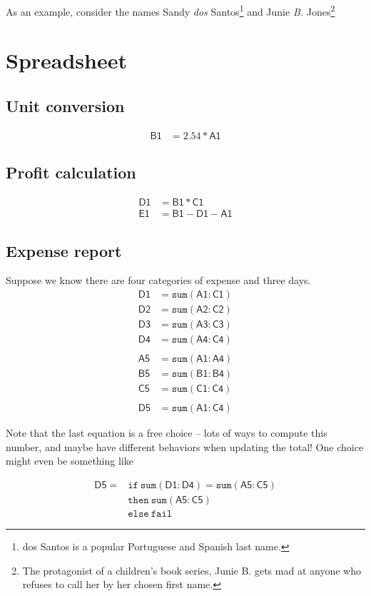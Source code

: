 \documentclass{article}
\newcommand\Sum{\texttt{sum}}
\newcommand\If{\texttt{if}}
\newcommand\Then{\texttt{then}}
\newcommand\Else{\texttt{else}}
\newcommand\Fail{\texttt{fail}}
\newcommand\cell[1]{\mathsf{#1}}
\begin{document}
As an example, consider the names Sandy \emph{dos} Santos\footnote{dos Santos
is a popular Portuguese and Spanish last name.}
and Junie \emph{B.} Jones\footnote{The protagonist of a children's
book series, Junie B. gets mad at anyone who refuses to call her by her chosen
first name.}


\section{Spreadsheet}
\subsection{Unit conversion}
\begin{align*}
    \cell{B1} &= 2.54*\cell{A1}
\end{align*}

\subsection{Profit calculation}
\begin{align*}
    \cell{D1} &= \cell{B1}*\cell{C1} \\
    \cell{E1} &= \cell{B1}-\cell{D1}-\cell{A1}
\end{align*}

\subsection{Expense report}
Suppose we know there are four categories of expense and three days.
\begin{align*}
    \cell{D1} &= \Sum(\cell{A1}:\cell{C1}) \\
    \cell{D2} &= \Sum(\cell{A2}:\cell{C2}) \\
    \cell{D3} &= \Sum(\cell{A3}:\cell{C3}) \\
    \cell{D4} &= \Sum(\cell{A4}:\cell{C4}) \\
    \\
    \cell{A5} &= \Sum(\cell{A1}:\cell{A4}) \\
    \cell{B5} &= \Sum(\cell{B1}:\cell{B4}) \\
    \cell{C5} &= \Sum(\cell{C1}:\cell{C4}) \\
    \\
    \cell{D5} &= \Sum(\cell{A1}:\cell{C4})
\end{align*}

Note that the last equation is a free choice -- lots of ways to compute this
number, and maybe have different behaviors when updating the total! One
choice might even be something like

\begin{align*}
    \cell{D5} ={}& \If\ \Sum(\cell{D1}:\cell{D4})=\Sum(\cell{A5}:\cell{C5}) \\
    & \Then\ \Sum(\cell{A5}:\cell{C5}) \\
    & \Else\ \Fail
\end{align*}
\end{document}

